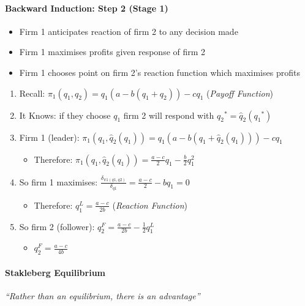 \documentclass[11pt, english]{article}
\begin{document}
	\newpage

		\paragraph{Backward Induction: Step 2 (Stage 1)}

	\begin{itemize}
	\setlength\itemsep{0cm}
		\item Firm 1 anticipates reaction of firm 2 to any decision made
		\item Firm 1 maximises profits given response of firm 2
		\item Firm 1 chooses point on firm 2's reaction function which maximises profits
	\end{itemize}
	
	\begin{enumerate}                                       
        \setlength\itemsep{0cm}
		\item Recall: $\pi_1(q_1{,q}_2)=q_1(a-b(q_1+q_2))-cq_1$ (\textit{Payoff Function})
		\item It Knows: if they choose $q_1$ firm 2 will respond with ${q_2}^\ast={\hat{q}}_2({q_1}^\ast)$
		\item Firm 1 (leader): $\pi_1(q_1{,\hat{q}}_2(q_1))=q_1(a-b(q_1+{\hat{q}}_2(q_1)))-cq_1$
		\begin{itemize}
			\item Therefore: $\pi_1\left(q_1{,\hat{q}}_2\left(q_1\right)\right)=\frac{a-c}{2}q_1-\frac{b}{2}q_1^2$
		\end{itemize}
		\item So firm 1 maximises: $\frac{\delta_{\pi1(q1,q2)}}{\delta_{q1}}=\frac{a-c}{2}-{bq}_1=0$
		\begin{itemize}
			\item Therefore: $q_1^L=\frac{a-c}{2b}$ (\textit{Reaction Function})
		\end{itemize}
		\item So firm 2 (follower): $q_2^F=\frac{a-c}{2b}-\frac{1}{2}q_1^L$
		\begin{itemize}
			\item $q_2^F=\frac{a-c}{4b}$
		\end{itemize}
	\end{enumerate}

		\paragraph{Stakleberg Equilibrium}

	\textit{``Rather than an equilibrium, there is an advantage''}\\
\end{document}
